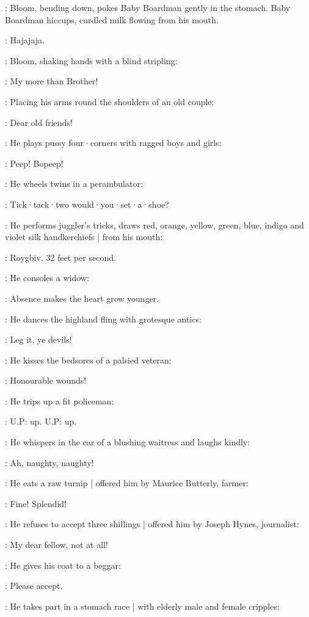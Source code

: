 :
Bloom,
bending down,
pokes Baby Boardman gently in the stomach.
Baby Boardman hiccups,
curdled milk flowing from his mouth.

\BabyBoardman:
Hajajaja.

:
Bloom,
shaking hands with a blind stripling:

\Bloom:
My more than Brother!

:
Placing his arms round the shoulders of an old couple:

\Bloom:
Dear old friends!

:
He plays pussy four·corners with ragged boys and girls:

\Bloom:
Peep!
Bopeep!

:
He wheels twins in a perambulator:

\Bloom:
Tick·tack·two would·you·set·a·shoe?

:
He performs juggler's tricks,
draws red,
orange,
yellow,
green,
blue,
indigo 
and violet silk handkerchiefs |
from his mouth:

\Bloom:
Roygbiv.
32 feet per second.

:
He consoles a widow:

\Bloom:
Absence makes the heart grow younger.

:
He dances the highland fling with grotesque antics:

\Bloom:
Leg it,
ye devils!

:
He kisses the bedsores of a palsied veteran:

\Bloom:
Honourable wounds!

:
He trips up a fit policeman:

\Bloom:
U.P:
up.
U.P:
up.

:
He whispers in the ear of a blushing waitress and laughs kindly:

\Bloom:
Ah,
naughty,
naughty!

:
He eats a raw turnip |
offered him by Maurice Butterly,
farmer:

\Bloom:
Fine!
Splendid!

:
He refuses to accept three shillings |
offered him by Joseph Hynes,
journalist:

\Bloom:
My dear fellow,
not at all!

:
He gives his coat to a beggar:

\Bloom:
Please accept.

:
He takes part in a stomach race |
with elderly male and female cripples:

